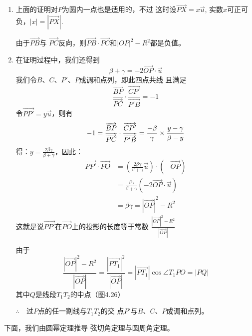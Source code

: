 \begin{analyze}
\begin{enumerate}
    \item 上面的证明对$P$为圆内一点也是适用的，不过
    这时设$\Vec{PX}=x\vec{u}$, 实数$x$可正可负，$|x|=|\Vec{PX}|$.
    
    由于$\Vec{PB}$与
    $\Vec{PC}$反向，则$\Vec{PB}\cdot \Vec{PC}$和$|OP|^2-R^2$都是负值。

\item 在证明过程中，我们还得到
\[\beta+\gamma=-2\Vec{OP}\cdot \vec{u}\]
我们令$B$、$C$、$P'$、$P$成调和点列，即此四点共线
且满足
\[\frac{\Vec{BP}}{\Vec{PC}}\cdot \frac{\Vec{CP'}}{\Vec{P'B}}=-1\]
令$\Vec{PP'}=y\vec{u}$，则有
\[-1=\dfrac{\overrightarrow{BP}}{\overrightarrow{PC}}\cdot \dfrac{\overrightarrow{CP'}}{\overrightarrow{P'B}}=\dfrac{-\beta}{\gamma}\times \dfrac{y-\gamma}{\beta-y}\]
得：$y=\frac{2\beta\gamma}{\beta+\gamma}$，因此：
\[\begin{split}
    \Vec{PP'}\cdot \Vec{PO}&=\left(\frac{2\beta \gamma}{\beta+\gamma}\vec{u}\right)\cdot \left(-\Vec{OP}\right)\\
    &=\frac{\beta \gamma}{\beta+\gamma}\left(-2\Vec{OP}\cdot \vec{u}\right)\\
    &=\beta\gamma =|\Vec{OP}|^2-R^2
\end{split}\]
这就是说$\Vec{PP'}$在$\Vec{PO}$上的投影的长度等于常数
$\frac{|\Vec{OP}|^2-R^2}{|\Vec{OP}|}$

由于
\[\frac{|\Vec{OP}|^2-R^2}{|\Vec{OP}|}=\frac{|\Vec{PT_1}|^2}{|\Vec{OP}|}=|\Vec{PT_1}|\cos\angle T_1PO=|PQ|\]
其中$Q$是线段$T_1T_2$的中点（图4.26）

$\therefore\quad $过$P$点的任一割线与$T_1T_2$的交
点$P'$与$B$、$C$、$P$成调和点列。
\end{enumerate}
\end{analyze}

下面，我们由圆幂定理推导
弦切角定理与圆周角定理。

\begin{figure}[htp]\centering
    \begin{minipage}[t]{0.48\textwidth}
    \centering
{}
    \caption{}
    \end{minipage}
    \begin{minipage}[t]{0.48\textwidth}
    \centering
    \caption{}
    \end{minipage}
    \end{figure}


